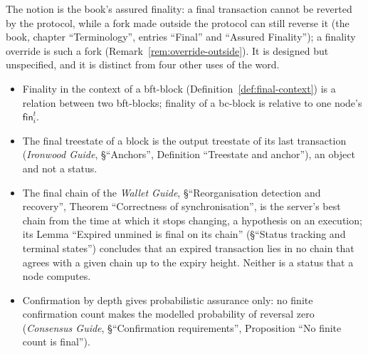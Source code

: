 \documentclass[11pt,a4paper]{article}
\theoremstyle{definition}
\newcommand{\fin}{\mathsf{fin}}
\begin{document}
The notion is the book's assured finality: a final transaction cannot be
reverted by the protocol, while a fork made outside the protocol can still
reverse it (the book, chapter ``Terminology'', entries ``Final'' and
``Assured Finality''); a finality override is such a fork
(Remark~\ref{rem:override-outside}). It is designed but unspecified, and it
is distinct from four other uses of the word.
\begin{itemize}
\item Finality in the context of a bft-block
  (Definition~\ref{def:final-context}) is a relation between two
  bft-blocks; finality of a bc-block is relative to one node's $\fin_i^t$.
\item The final treestate of a block is the output treestate of its last
  transaction (\emph{Ironwood Guide}, \S``Anchors'', Definition ``Treestate
  and anchor''), an object and not a status.
\item The final chain of the \emph{Wallet Guide}, \S``Reorganisation
  detection and recovery'', Theorem ``Correctness of synchronisation'', is
  the server's best chain from the time at which it stops changing, a
  hypothesis on an execution; its Lemma ``Expired unmined is final on its
  chain'' (\S``Status tracking and terminal states'') concludes that an
  expired transaction lies in no chain that agrees with a given chain up to
  the expiry height. Neither is a status that a node computes.
\item Confirmation by depth gives probabilistic assurance only: no finite
  confirmation count makes the modelled probability of reversal zero
  (\emph{Consensus Guide}, \S``Confirmation requirements'', Proposition ``No
  finite count is final'').
\end{itemize}
\end{document}
